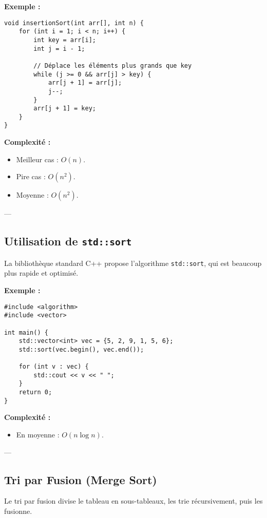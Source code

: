 \textbf{Exemple :}
\begin{tcolorbox}[colframe=blue!50!black, colback=blue!5!white, title=Exemple d'Attributs et Méthodes Statistiques]
\begin{verbatim}
void insertionSort(int arr[], int n) {
    for (int i = 1; i < n; i++) {
        int key = arr[i];
        int j = i - 1;

        // Déplace les éléments plus grands que key
        while (j >= 0 && arr[j] > key) {
            arr[j + 1] = arr[j];
            j--;
        }
        arr[j + 1] = key;
    }
}
\end{verbatim}
\end{tcolorbox}

\textbf{Complexité :}
\begin{itemize}
    \item Meilleur cas : $O(n)$.
    \item Pire cas : $O(n^2)$.
    \item Moyenne : $O(n^2)$.
\end{itemize}

---

\subsection{ Utilisation de \texttt{std::sort}}
La bibliothèque standard C++ propose l'algorithme \texttt{std::sort}, qui est beaucoup plus rapide et optimisé.

\textbf{Exemple :}
\begin{tcolorbox}[colframe=blue!50!black, colback=blue!5!white, title=Exemple d'Attributs et Méthodes Statistiques]
\begin{verbatim}
#include <algorithm>
#include <vector>

int main() {
    std::vector<int> vec = {5, 2, 9, 1, 5, 6};
    std::sort(vec.begin(), vec.end());

    for (int v : vec) {
        std::cout << v << " ";
    }
    return 0;
}
\end{verbatim}
\end{tcolorbox}

\textbf{Complexité :}
\begin{itemize}
    \item En moyenne : $O(n \log n)$.
\end{itemize}

---

\subsection{ Tri par Fusion (Merge Sort)}
Le tri par fusion divise le tableau en sous-tableaux, les trie récursivement, puis les fusionne.

